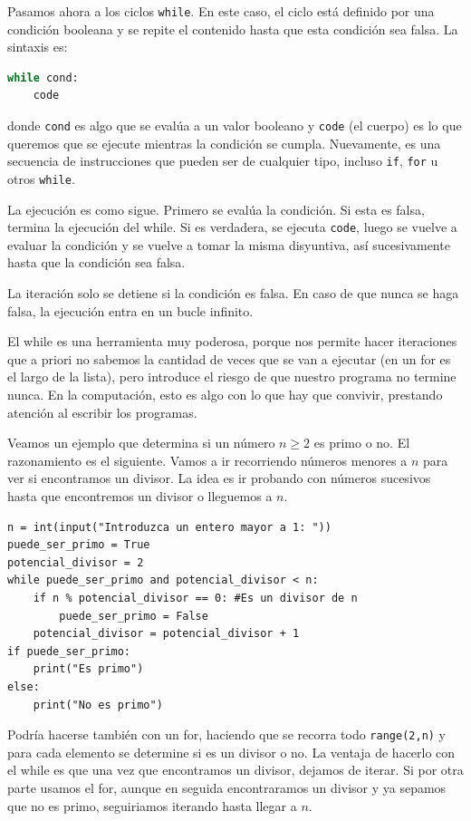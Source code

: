 \documentclass[a4paper, 12pt]{report}
\theoremstyle{definition}
\begin{document}
Pasamos ahora a los ciclos {\tt while}. En este caso, el ciclo está definido por una condición booleana y se repite el contenido hasta que esta condición sea falsa. La sintaxis es:
\begin{lstlisting}[language=python]
while cond:
    code
\end{lstlisting}
donde {\tt cond} es algo que se evalúa a un valor booleano y {\tt code} (el cuerpo) es lo que queremos que se ejecute mientras la condición se cumpla. Nuevamente, es una secuencia de instrucciones que pueden ser de cualquier tipo, incluso {\tt if}, {\tt for} u otros {\tt while}.

La ejecución es como sigue. Primero se evalúa la condición. Si esta es falsa, termina la ejecución del while. Si es verdadera, se ejecuta {\tt code}, luego se vuelve a evaluar la condición y se vuelve a tomar la misma disyuntiva, así sucesivamente hasta que la condición sea falsa.

La iteración solo se detiene si la condición es falsa. En caso de que nunca se haga falsa, la ejecución entra en un bucle infinito.

El while es una herramienta muy poderosa, porque nos permite hacer iteraciones que a priori no sabemos la cantidad de veces que se van a ejecutar (en un for es el largo de la lista), pero introduce el riesgo de que nuestro programa no termine nunca. En la computación, esto es algo con lo que hay que convivir, prestando atención al escribir los programas.

Veamos un ejemplo que determina si un número $n\geq 2$ es primo o no. El razonamiento es el siguiente. Vamos a ir recorriendo números menores a $n$ para ver si encontramos un divisor. La idea es ir probando con números sucesivos hasta que encontremos un divisor o lleguemos a $n$.
\begin{verbatim}
n = int(input("Introduzca un entero mayor a 1: "))
puede_ser_primo = True
potencial_divisor = 2
while puede_ser_primo and potencial_divisor < n:
    if n % potencial_divisor == 0: #Es un divisor de n
        puede_ser_primo = False
    potencial_divisor = potencial_divisor + 1
if puede_ser_primo:
    print("Es primo")
else:
    print("No es primo")
\end{verbatim}
Podría hacerse también con un for, haciendo que se recorra todo {\tt range(2,n)} y para cada elemento se determine si es un divisor o no. La ventaja de hacerlo con el while es que una vez que encontramos un divisor, dejamos de iterar. Si por otra parte usamos el for, aunque en seguida encontraramos un divisor y ya sepamos que no es primo, seguiriamos iterando hasta llegar a $n$.
\end{document}
